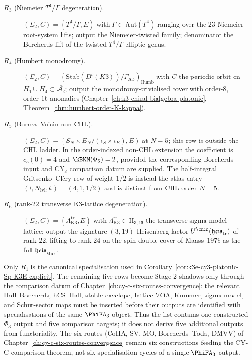 \begin{remark}
\begin{description}
 \item[$R_3$ (Niemeier $T^4/\Gamma$ degeneration).] $(\Sigma_2, C) = (T^4/\Gamma, E)$ with $\Gamma \subset \mathrm{Aut}(T^4)$ ranging over the $23$ Niemeier root-system lifts; output the Niemeier-twisted family; denominator the Borcherds lift of the twisted $T^4/\Gamma$ elliptic genus.
 \item[$R_4$ (Humbert monodromy).] $(\Sigma_2, C) = (\mathrm{Stab}(D^b(K3)) / \Gamma_{K3})_{\mathrm{Humb}}$ with $C$ the periodic orbit on $H_1 \cup H_4 \subset \overline{\mathcal{A}_2}$; output the monodromy-trivialised cover with order-$8$, order-$16$ anomalies (Chapter~\ref{ch:k3-chiral-bialgebra-platonic}, Theorem~\ref{thm:humbert-order-K-kappa}).
\item[$R_5$ (Borcea--Voisin non-CHL).] $(\Sigma_2, C) = (S_N \times E_N / (\iota_S \times \iota_E), E)$ at $N = 5$; this row is outside the CHL ladder.  In the order-indexed non-CHL extension the coefficient is $c_5(0)=4$ and $\kBKM(\Phi_5)=2$, provided the corresponding Borcherds input and CY$_3$ comparison datum are supplied.  The half-integral Gritsenko--Cl\'ery row of weight $1/2$ is instead the atlas entry $(t,N_{\mathrm{lvl}};k)=(4,1;1/2)$ and is distinct from CHL order $N=5$.
 \item[$R_6$ (rank-$22$ transverse K3-lattice degeneration).] $(\Sigma_2, C) = (\Lambda_{\mathrm{K3}}^{\mathrm{tr}}, E)$ with $\Lambda_{\mathrm{K3}}^{\mathrm{tr}} \subset \mathrm{II}_{3, 19}$ the transverse sigma-model lattice; output the signature-$(3, 19)$ Heisenberg factor $U^{\chir}(\mathfrak{heis}_{\mathrm{tr}})$ of rank $22$, lifting to rank $24$ on the spin double cover of Maass~$1979$ as the full $\mathfrak{heis}_{\mathrm{Muk}}$.
\end{description}
Only $R_1$ is the canonical specialisation used in Corollary~\ref{cor:k3e-cy3-platonic-Sp-K3E-explicit}. The remaining five rows become Stage-$2$ shadows only through the comparison datum of Chapter~\ref{ch:cy-c-six-routes-convergence}: the relevant Hall--Borcherds, hCS--Hall, stable-envelope, lattice-VOA, Kummer, sigma-model, and Schur-sector maps must be inserted before their outputs are identified with specialisations of the same $\PhiFA_3$-object. Thus the list contains one constructed $\Phi_3$ output and five comparison targets; it does not derive five additional outputs from functoriality. The six routes (CoHA, SV, MO, Borcherds, Toda, DMVV) of Chapter~\ref{ch:cy-c-six-routes-convergence} remain six constructions feeding the CY-C comparison theorem, not six specialisation cycles of a single $\PhiFA_3$-output.
\end{remark}

